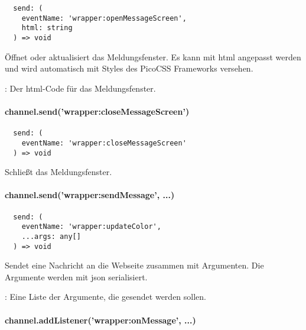 \begin{verbatim}
  send: (
    eventName: 'wrapper:openMessageScreen',
    html: string
  ) => void
\end{verbatim}

Öffnet oder aktualisiert das Meldungsfenster.
Es kann mit \ac{html} angepasst werden und wird automatisch mit Styles des PicoCSS Frameworks versehen.

\begin{arguments}
  \item {}: Der \ac{html}-Code für das Meldungsfenster.
\end{arguments}


\paragraph{channel.send('wrapper:closeMessageScreen')}

\begin{verbatim}
  send: (
    eventName: 'wrapper:closeMessageScreen'
  ) => void
\end{verbatim}

Schließt das Meldungsfenster.


\paragraph{channel.send('wrapper:sendMessage', ...)}

\begin{verbatim}
  send: (
    eventName: 'wrapper:updateColor',
    ...args: any[]
  ) => void
\end{verbatim}

Sendet eine Nachricht an die Webseite zusammen mit Argumenten.
Die Argumente werden mit \ac{json} serialisiert.

\begin{arguments}
  \item {}: Eine Liste der Argumente, die gesendet werden sollen.
\end{arguments}


\paragraph{channel.addListener('wrapper:onMessage', ...)}

